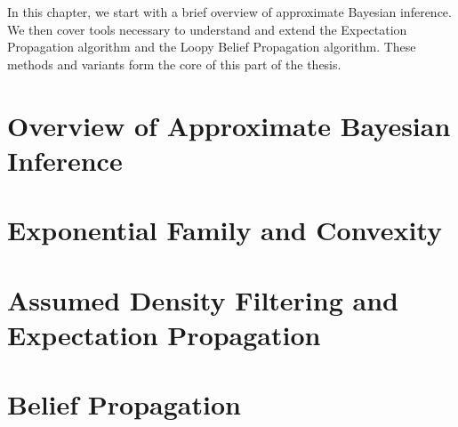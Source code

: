 
In this chapter, we start with a brief overview of approximate Bayesian inference. We then cover tools  necessary to understand and extend the Expectation Propagation algorithm and the Loopy Belief Propagation algorithm. These methods and variants form the core of this part of the thesis.

\section{\label{sec:ABI}Overview of Approximate Bayesian Inference}



\section{\label{point:expof-convex}Exponential Family and Convexity}





\section{\label{s:ADF+EP}Assumed Density Filtering and Expectation Propagation}


\section{\label{bg:belief-propag}Belief Propagation}








